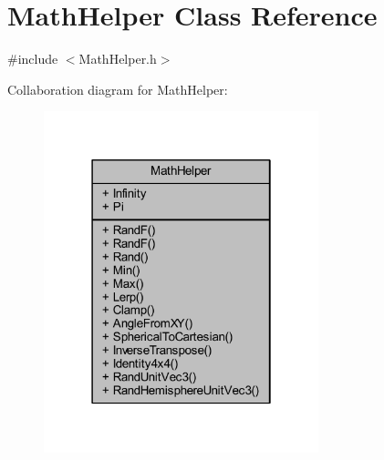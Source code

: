 \hypertarget{class_math_helper}{}\section{Math\+Helper Class Reference}
\label{class_math_helper}


{\ttfamily \#include $<$Math\+Helper.\+h$>$}



Collaboration diagram for Math\+Helper\+:\nopagebreak
\begin{figure}[H]
\begin{center}
\leavevmode
\includegraphics[width=226pt]{class_math_helper__coll__graph}
\end{center}
\end{figure}
